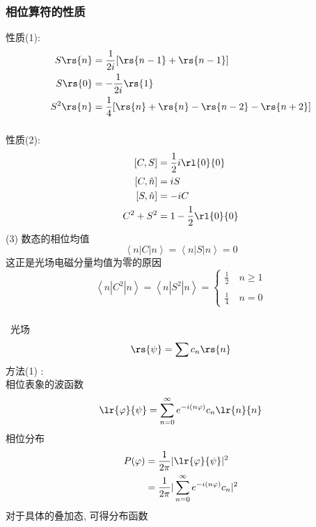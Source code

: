 \begin{frame} 
\frametitle{相位算符的性质}
性质(1):
\[ \begin{aligned}
        S \rs{n} &= \frac{1}{2i} [\rs{n-1}+\rs{n-1}]\\
        S \rs{0} &=-\frac{1}{2i} \rs{1}\\
        S^2 \rs{n}&= \frac{1}{4} [\rs{n}+\rs{n}- \rs{n-2}-\rs{n+2}] \\  
     \end{aligned}\] 
\end{frame}


\begin{frame} 
\frametitle{}
性质(2):
\[ \begin{aligned}
        [C, S] & = \frac{1}{2}i \rl{0}{0}\\
        [C, \hat {n} ] & = i S \\ 
        [S, \hat {n} ] & = -i C \\ 
        C^2 + S^2 &= 1-\frac{1}{2} \rl{0}{0} 
     \end{aligned}\] 
(3) 数态的相位均值
   \[ \left\langle n|C|n \right\rangle = \left\langle n|S|n \right\rangle =0 \]
这正是光场电磁分量均值为零的原因
   \[ \left\langle n|C^2|n \right\rangle = \left\langle n|S^2|n \right\rangle = 
   \begin{cases}
    \frac{1}{2} \quad  n \ge 1 \\ 
    ~\\
    \frac{1}{4} \quad  n = 0
   \end{cases} \]
\end{frame}

\begin{frame} 
\frametitle{}
    \解 ~光场 
    \[ \rs{\psi} = \sum c_n \rs{n} \]
     方法(1) : \\
    相位表象的波函数
     \[ \lr{\varphi}{\psi} = \sum_ {n=0} ^ \infty e^{-i (n\varphi)} c_n \lr{n} {n} \]
     相位分布 
     \[ \begin{aligned}
       P(\varphi) &= \frac{1}{2 \pi} |\lr{\varphi}{\psi} |^2 \\
       &= \frac{1}{2 \pi} | \sum_ {n=0} ^ \infty e^{-i (n\varphi)} c_n  |^2 \\
     \end{aligned}\] 
     对于具体的叠加态, 可得分布函数
\end{frame}

